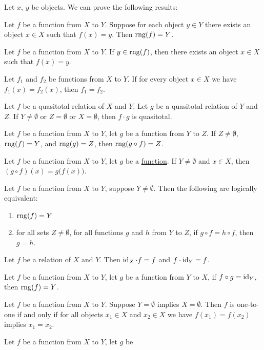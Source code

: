 \documentclass{article}
\begin{document}
Let $x$, $y$ be objects.
We can prove the following results:
\begin{thm}
\item\label{funct2:10} Let $f$ be a function from $X$ to $Y$.
  Suppose for each object $y\in Y$ there exists an object $x\in X$
  such that $f(x)=y$. Then $\operatorname{rng}(f)=Y$.
\item\label{funct2:11} Let $f$ be a function from $X$ to $Y$.
  If $y\in\operatorname{rng}(f)$, then there exists an object $x\in X$ such that $f(x)=y$.
\item\label{funct2:12} Let $f_{1}$ and $f_{2}$ be functions from $X$ to $Y$.
  If for every object $x\in X$ we have $f_{1}(x)=f_{2}(x)$,
  then $f_{1}=f_{2}$.
\item\label{funct2:13} Let $f$ be a quasitotal relation of $X$ and $Y$.
  Let $g$ be a quasitotal relation of $Y$ and $Z$.
  If $Y\neq\emptyset$ or $Z=\emptyset$ or $X=\emptyset$, then $f\cdot g$
  is quasitotal.
\item\label{funct2:14} Let $f$ be a function from $X$ to $Y$,
  let $g$ be a function from $Y$ to $Z$.
  If $Z\neq\emptyset$, $\operatorname{rng}(f)=Y$, and $\operatorname{rng}(g)=Z$, then $\operatorname{rng}(g\circ f)=Z$.
\item\label{funct2:15} Let $f$ be a function from $X$ to $Y$,
  let $g$ be a \hyperlink{definition:funct1:nm1}{function}.
  If $Y\neq\emptyset$ and $x\in X$, then $(g\circ f)(x)=g\bigl(f(x)\bigr)$.
\item\label{funct2:16} Let $f$ be a function from $X$ to $Y$, suppose
  $Y\neq\emptyset$. Then the following are logically equivalent:
  \begin{enumerate}[label=(\roman*)]
  \item $\operatorname{rng}(f)=Y$ 
  \item for all sets $Z\neq\emptyset$, for all
  functions $g$ and $h$ from $Y$ to $Z$, if $g\circ f=h\circ f$, then $g=h$.
  \end{enumerate}
\item\label{funct2:17} Let $f$ be a relation of $X$ and $Y$.
  Then $\operatorname{id}_{X}\cdot f=f$ and $f\cdot\operatorname{id}_{Y}=f$.
\item\label{funct2:18} Let $f$ be a function from $X$ to $Y$, let $g$ be
  a function from $Y$ to $X$, if $f\circ g=\operatorname{id}_{Y}$, then $\operatorname{rng}(f)=Y$.
\item\label{funct2:19} Let $f$ be a function from $X$ to $Y$. Suppose
  $Y=\emptyset$ implies $X=\emptyset$. Then $f$ is one-to-one if and
  only if for all objects $x_{1}\in X$ and $x_{2}\in X$ we have
  $f(x_{1})=f(x_{2})$ implies $x_{1}=x_{2}$.
\item\label{funct2:20} Let $f$ be a function from $X$ to $Y$, let $g$ be

\end{thm}
\end{document}
